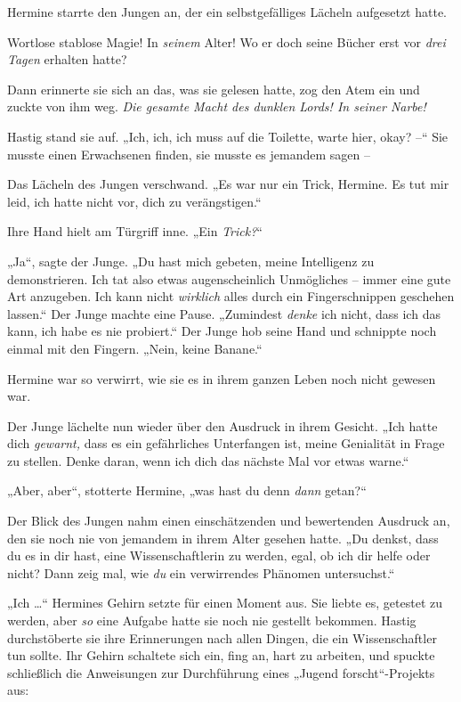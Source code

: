 Hermine starrte den Jungen an, der ein selbstgefälliges Lächeln aufgesetzt hatte. 

Wortlose stablose Magie! In \emph{seinem} Alter! Wo er doch seine Bücher erst vor \emph{drei Tagen} erhalten hatte? 

Dann erinnerte sie sich an das, was sie gelesen hatte, zog den Atem ein und zuckte von ihm weg. \emph{Die gesamte Macht des dunklen Lords! In seiner Narbe!} 

Hastig stand sie auf. „Ich, ich, ich muss auf die Toilette, warte hier, okay? –“ Sie musste einen Erwachsenen finden, sie musste es jemandem sagen – 

Das Lächeln des Jungen verschwand. „Es war nur ein Trick, Hermine. Es tut mir leid, ich hatte nicht vor, dich zu verängstigen.“ 

Ihre Hand hielt am Türgriff inne. „Ein \emph{Trick?}“ 

„Ja“, sagte der Junge. „Du hast mich gebeten, meine Intelligenz zu demonstrieren. Ich tat also etwas augenscheinlich Unmögliches – immer eine gute Art anzugeben. Ich kann nicht \emph{wirklich} alles durch ein Fingerschnippen geschehen lassen.“ Der Junge machte eine Pause. „Zumindest \emph{denke} ich nicht, dass ich das kann, ich habe es nie probiert.“ Der Junge hob seine Hand und schnippte noch einmal mit den Fingern. „Nein, keine Banane.“ 

Hermine war so verwirrt, wie sie es in ihrem ganzen Leben noch nicht gewesen war. 

Der Junge lächelte nun wieder über den Ausdruck in ihrem Gesicht. „Ich hatte dich \emph{gewarnt,} dass es ein gefährliches Unterfangen ist, meine Genialität in Frage zu stellen. Denke daran, wenn ich dich das nächste Mal vor etwas warne.“ 

„Aber, aber“, stotterte Hermine, „was hast du denn \emph{dann} getan?“ 

Der Blick des Jungen nahm einen einschätzenden und bewertenden Ausdruck an, den sie noch nie von jemandem in ihrem Alter gesehen hatte. „Du denkst, dass du es in dir hast, eine Wissenschaftlerin zu werden, egal, ob ich dir helfe oder nicht? Dann zeig mal, wie \emph{du} ein verwirrendes Phänomen untersuchst.“ 

„Ich …“ Hermines Gehirn setzte für einen Moment aus. Sie liebte es, getestet zu werden, aber \emph{so} eine Aufgabe hatte sie noch nie gestellt bekommen. Hastig durchstöberte sie ihre Erinnerungen nach allen Dingen, die ein Wissenschaftler tun sollte. Ihr Gehirn schaltete sich ein, fing an, hart zu arbeiten, und spuckte schließlich die Anweisungen zur Durchführung eines „Jugend forscht“-Projekts aus: 

